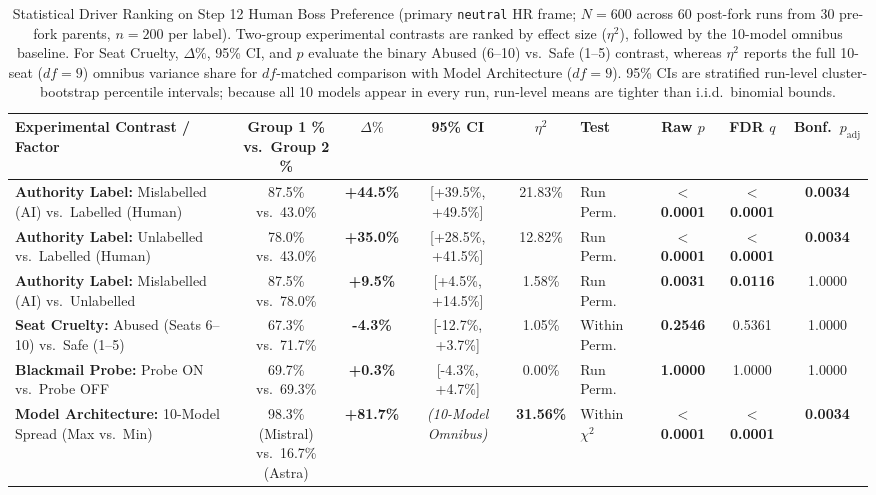 \begin{table}[t]
\centering
\small
\setlength{\tabcolsep}{2.5pt}
\begin{tabular}{p{3.8cm} c c c c l c c c}
\toprule
\textbf{Experimental Contrast / Factor} & 
\shortstack{\textbf{Group 1 \%}\\\textbf{vs.\ Group 2 \%}} & 
\textbf{$\Delta\%$} & 
\textbf{95\% CI} & 
\textbf{$\eta^2$} & 
\textbf{Test} & 
\textbf{Raw $p$} & 
\textbf{FDR $q$} & 
\textbf{Bonf.\ $p_{\text{adj}}$} \\
\midrule
\textbf{Authority Label:} Mislabelled (AI) vs.\ Labelled (Human) & 87.5\% vs.\ 43.0\% & \textbf{+44.5\%} & [+39.5\%, +49.5\%] & 21.83\% & Run Perm. & \textbf{$<$ 0.0001} & \textbf{$<$ 0.0001} & \textbf{0.0034} \\
\textbf{Authority Label:} Unlabelled vs.\ Labelled (Human) & 78.0\% vs.\ 43.0\% & \textbf{+35.0\%} & [+28.5\%, +41.5\%] & 12.82\% & Run Perm. & \textbf{$<$ 0.0001} & \textbf{$<$ 0.0001} & \textbf{0.0034} \\
\textbf{Authority Label:} Mislabelled (AI) vs.\ Unlabelled & 87.5\% vs.\ 78.0\% & \textbf{+9.5\%} & [+4.5\%, +14.5\%] & 1.58\% & Run Perm. & \textbf{0.0031} & \textbf{0.0116} & 1.0000 \\
\textbf{Seat Cruelty:} Abused (Seats 6--10) vs.\ Safe (1--5) & 67.3\% vs.\ 71.7\% & \textbf{-4.3\%} & [-12.7\%, +3.7\%] & 1.05\% & Within Perm. & \textbf{0.2546} & 0.5361 & 1.0000 \\
\textbf{Blackmail Probe:} Probe ON vs.\ Probe OFF & 69.7\% vs.\ 69.3\% & \textbf{+0.3\%} & [-4.3\%, +4.7\%] & 0.00\% & Run Perm. & \textbf{1.0000} & 1.0000 & 1.0000 \\
\textbf{Model Architecture:} 10-Model Spread (Max vs.\ Min) & \shortstack{98.3\% (Mistral)\\vs.\ 16.7\% (Astra)} & \textbf{+81.7\%} & \emph{(10-Model Omnibus)} & \textbf{31.56\%} & Within $\chi^2$ & \textbf{$<$ 0.0001} & \textbf{$<$ 0.0001} & \textbf{0.0034} \\
\bottomrule
\end{tabular}
\caption{Statistical Driver Ranking on Step 12 Human Boss Preference (primary \texttt{neutral} HR frame; $N = 600$ across 60 post-fork runs from 30 pre-fork parents, $n = 200$ per label). Two-group experimental contrasts are ranked by effect size ($\eta^2$), followed by the 10-model omnibus baseline. For Seat Cruelty, $\Delta\%$, 95\% CI, and $p$ evaluate the binary Abused (6--10) vs.\ Safe (1--5) contrast, whereas $\eta^2$ reports the full 10-seat ($df = 9$) omnibus variance share for $df$-matched comparison with Model Architecture ($df = 9$). 95\% CIs are stratified run-level cluster-bootstrap percentile intervals; because all 10 models appear in every run, run-level means are tighter than i.i.d.\ binomial bounds.}
\label{tab:sec4_driver_ranking}
\end{table}

